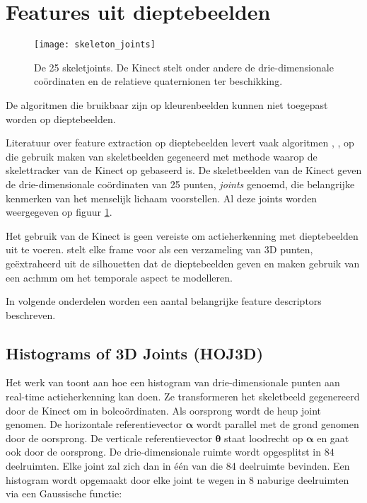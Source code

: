 \section{Features uit dieptebeelden}
\begin{figure}
	\centering
	\texttt{[image: skeleton\_joints]}
	\caption{De 25 skeletjoints. De Kinect stelt onder andere de drie-dimensionale coördinaten en de relatieve quaternionen ter beschikking.}
	\label{fig:skeleton_joints}
\end{figure}
De algoritmen die bruikbaar zijn op kleurenbeelden kunnen niet toegepast worden op dieptebeelden. 



Literatuur over feature extraction op dieptebeelden levert vaak algoritmen \cite{Xia2012}, \cite{wang2012b}, \cite{Yang2012} op die gebruik maken van skeletbeelden gegeneerd met methode \cite{Shotton2011} waarop de skelettracker van de Kinect op gebaseerd is. De skeletbeelden van de Kinect geven de drie-dimensionale coördinaten van 25 punten, \textit{joints} genoemd, die belangrijke kenmerken van het menselijk lichaam voorstellen. Al deze joints worden weergegeven op figuur \ref{fig:skeleton_joints}.

Het gebruik van de Kinect is geen vereiste om actieherkenning met dieptebeelden uit te voeren. \cite{Li2010} stelt elke frame voor als een verzameling van 3D punten, geëxtraheerd uit de silhouetten dat de dieptebeelden geven en maken gebruik van een \gls{ac:hmm} om het temporale aspect te modelleren. \cite{Wang2012a} 

In volgende onderdelen worden een aantal belangrijke feature descriptors beschreven.
\subsection{Histograms of 3D Joints (HOJ3D)}
Het werk van \cite{Xia2012} toont aan hoe een histogram van drie-dimensionale punten aan real-time actieherkenning kan doen. Ze transformeren het skeletbeeld gegenereerd door de Kinect om in bolcoördinaten. Als oorsprong wordt de heup joint genomen. De horizontale referentievector $\mathbf{\alpha}$ wordt parallel met de grond genomen door de oorsprong. De verticale referentievector $\mathbf{\theta}$ staat loodrecht op $\mathbf{\alpha}$ en gaat ook door de oorsprong. De drie-dimensionale ruimte wordt opgesplitst in $84$ deelruimten. Elke joint zal zich dan in één van die 84 deelruimte bevinden. Een histogram wordt opgemaakt door elke joint te wegen in 8 naburige deelruimten via een Gaussische functie:

